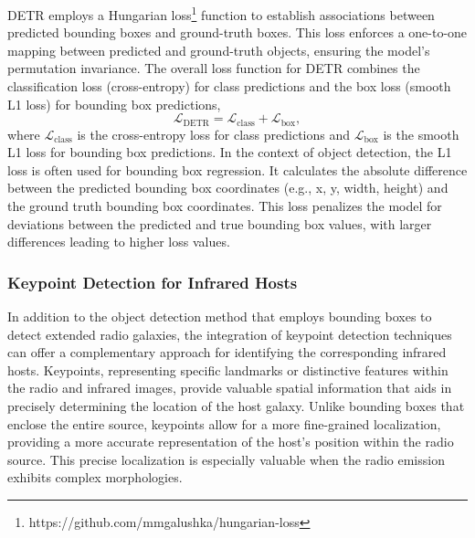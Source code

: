 \documentclass[
  journal=pasa,
  manuscript=research-paper, %
  year=2020,
  volume=37,
]{cup-journal}
\def \BE{\begin{equation}}
\def \EE{\end{equation}}
\begin{document}
DETR employs a Hungarian loss\footnote{https://github.com/mmgalushka/hungarian-loss} function to establish associations between predicted bounding boxes and ground-truth boxes. This loss enforces a one-to-one mapping between predicted and ground-truth objects, ensuring the model's permutation invariance.
The overall loss function for DETR combines the classification loss (cross-entropy) for class predictions and the box loss (smooth L1 loss) for bounding box predictions,
\BE
\mathcal{L}_{\text{DETR}} = \mathcal{L}_{\text{class}} +  \mathcal{L}_{\text{box}},
\label{EQ:LossDETR}
\EE
where $\mathcal{L}_{\text{class}}$ is the cross-entropy loss for class predictions and $\mathcal{L}_{\text{box}}$ is the smooth L1 loss for bounding box predictions.
In the context of object detection, the L1 loss is often used for bounding box regression. It calculates the absolute difference between the predicted bounding box coordinates (e.g., x, y, width, height) and the ground truth bounding box coordinates. This loss penalizes the model for deviations between the predicted and true bounding box values, with larger differences leading to higher loss values.

\subsubsection{Keypoint Detection for Infrared Hosts}
In addition to the object detection method that employs bounding boxes to detect extended radio galaxies, the integration of keypoint detection techniques \citep[e.g.][]{Simon_2017_CVPR} can offer a complementary approach for identifying the corresponding infrared hosts. 
Keypoints, representing specific landmarks or distinctive features within the radio and infrared images, provide valuable spatial information that aids in precisely determining the location of the host galaxy. 
Unlike bounding boxes that enclose the entire source, keypoints allow for a more fine-grained localization, providing a more accurate representation of the host's position within the radio source. 
This precise localization is especially valuable when the radio emission exhibits complex morphologies.
\end{document}
